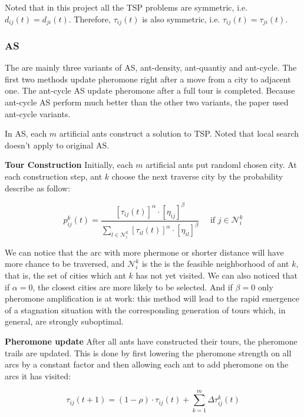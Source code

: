 \documentclass[twocolumn, a4paper]{extarticle}
\begin{document}
Noted that in this project all the TSP problems are symmetric, i.e. $d_{ij}(t) = d_{ji}(t)$. Therefore, $\tau_{ij}(t)$ is also symmetric, i.e. $\tau_{ij}(t) = \tau_{ji}(t)$.

\subsubsection{AS}

The are mainly three variants of AS, ant-density, ant-quantiy and ant-cycle. The first two methods update pheromone right after a move from a city to adjacent one. The ant-cycle AS update pheromone after a full tour is completed. Because ant-cycle AS perform much better than the other two variants, the paper used ant-cycle variants.

In AS, each $m$ artificial ants construct a solution to TSP. Noted that local search doesn't apply to original AS.

\textbf{Tour Construction} Initially, each $m$ artificial ants put randoml chosen city. At each construction step, ant $k$ choose the next traverse city by the probability describe as follow:

\begin{equation}
	p_{i j}^k(t)=\frac{\left[\tau_{i j}(t)\right]^\alpha \cdot\left[\eta_{i j}\right]^\beta}{\sum_{l \in \mathcal{N}_i^k}\left[\tau_{i l}(t)\right]^\alpha \cdot\left[\eta_{i l}\right]^\beta} \quad \text { if } j \in \mathcal{N}_i^k
	\label{eq: choice}
\end{equation}

We can notice that the arc with more phermone or shorter distance will have more chance to be traversed, and $\mathcal{N}_i^k$ is the is the feasible neighborhood of ant $k$, that is, the set of cities which ant $k$ has not yet visited. We can also noticed that if $\alpha=0$, the closest cities are more likely to be selected. And if $\beta=0$ only pheromone amplification is at work: this method will lead to the rapid emergence of a stagnation situation with the corresponding generation of tours which, in general, are strongly suboptimal.

\textbf{Pheromone update} After all ants have constructed their tours, the pheromone trails are updated. This is done by first lowering the pheromone strength on all arcs by a constant factor and then allowing each ant to add pheromone on the arcs it has visited:

\begin{equation}
	\tau_{i j}(t+1)=(1-\rho) \cdot \tau_{i j}(t)+\sum_{k=1}^m \Delta \tau_{i j}^k(t)
\end{equation}
\end{document}
